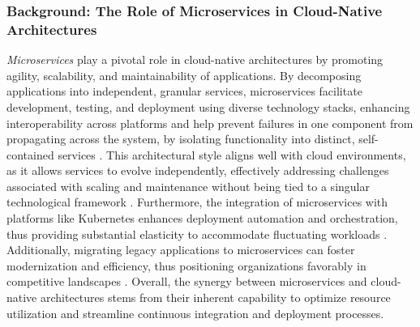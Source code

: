 \documentclass[11pt, a4paper, oneside, listof=totoc]{scrartcl}
\begin{document}
            \subsubsection{Background: The Role of Microservices in Cloud-Native Architectures}\label{subsubsec:microservices}
                \textit{Microservices} play a pivotal role in cloud-native architectures by
                promoting agility, scalability, and maintainability of applications.
                By decomposing applications into independent, granular services, microservices
                facilitate development, testing, and deployment using diverse technology stacks,
                enhancing interoperability across platforms
                \parencites[p.~1]{waseem2020}[p.~1]{larrucea2018} and help prevent failures
                in one component from propagating across the system, by isolating functionality into
                distinct, self-contained services \parencite[p.~62]{davis2019}.
                This architectural style aligns well with cloud environments, as it allows services
                to evolve independently, effectively addressing challenges associated with scaling
                and maintenance without being tied to a singular technological framework
                \parencite[pp.~202--203]{balalaie2016}.
                Furthermore, the integration of microservices with platforms like Kubernetes
                enhances deployment automation and orchestration, thus providing substantial
                elasticity to accommodate fluctuating workloads \parencite[p.~170]{haugeland2021}.
                Additionally, migrating legacy applications to microservices can foster
                modernization and efficiency, thus positioning organizations favorably in
                competitive landscapes \parencite[p.~214]{balalaie2016}.
                Overall, the synergy between microservices and cloud-native architectures stems from
                their inherent capability to optimize resource utilization and streamline continuous
                integration and deployment processes.
\end{document}
